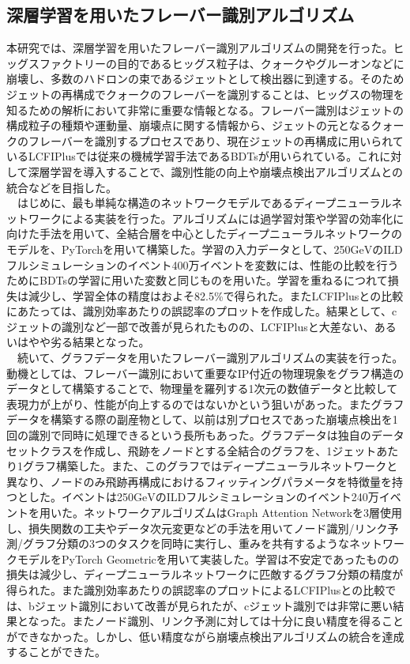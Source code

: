 \subsection*{深層学習を用いたフレーバー識別アルゴリズム}
本研究では、深層学習を用いたフレーバー識別アルゴリズムの開発を行った。ヒッグスファクトリーの目的であるヒッグス粒子は、クォークやグルーオンなどに崩壊し、多数のハドロンの束であるジェットとして検出器に到達する。そのためジェットの再構成でクォークのフレーバーを識別することは、ヒッグスの物理を知るための解析において非常に重要な情報となる。フレーバー識別はジェットの構成粒子の種類や運動量、崩壊点に関する情報から、ジェットの元となるクォークのフレーバーを識別するプロセスであり、現在ジェットの再構成に用いられているLCFIPlusでは従来の機械学習手法であるBDTsが用いられている。これに対して深層学習を導入することで、識別性能の向上や崩壊点検出アルゴリズムとの統合などを目指した。\\
　はじめに、最も単純な構造のネットワークモデルであるディープニューラルネットワークによる実装を行った。アルゴリズムには過学習対策や学習の効率化に向けた手法を用いて、全結合層を中心としたディープニューラルネットワークのモデルを、PyTorchを用いて構築した。学習の入力データとして、250$\mathrm{GeV}$のILDフルシミュレーションのイベント400万イベントを変数には、性能の比較を行うためにBDTsの学習に用いた変数と同じものを用いた。学習を重ねるにつれて損失は減少し、学習全体の精度はおよそ82.5\%で得られた。またLCFIPlusとの比較にあたっては、識別効率あたりの誤認率のプロットを作成した。結果として、cジェットの識別など一部で改善が見られたものの、LCFIPlusと大差ない、あるいはやや劣る結果となった。\\
　続いて、グラフデータを用いたフレーバー識別アルゴリズムの実装を行った。動機としては、フレーバー識別において重要なIP付近の物理現象をグラフ構造のデータとして構築することで、物理量を羅列する1次元の数値データと比較して表現力が上がり、性能が向上するのではないかという狙いがあった。またグラフデータを構築する際の副産物として、以前は別プロセスであった崩壊点検出を1回の識別で同時に処理できるという長所もあった。グラフデータは独自のデータセットクラスを作成し、飛跡をノードとする全結合のグラフを、1ジェットあたり1グラフ構築した。また、このグラフではディープニューラルネットワークと異なり、ノードのみ飛跡再構成におけるフィッティングパラメータを特徴量を持つとした。イベントは250$\mathrm{GeV}$のILDフルシミュレーションのイベント240万イベントを用いた。ネットワークアルゴリズムはGraph Attention Networkを3層使用し、損失関数の工夫やデータ次元変更などの手法を用いてノード識別/リンク予測/グラフ分類の3つのタスクを同時に実行し、重みを共有するようなネットワークモデルをPyTorch Geometricを用いて実装した。学習は不安定であったものの損失は減少し、ディープニューラルネットワークに匹敵するグラフ分類の精度が得られた。また識別効率あたりの誤認率のプロットによるLCFIPlusとの比較では、bジェット識別において改善が見られたが、cジェット識別では非常に悪い結果となった。またノード識別、リンク予測に対しては十分に良い精度を得ることができなかった。しかし、低い精度ながら崩壊点検出アルゴリズムの統合を達成することができた。\\
